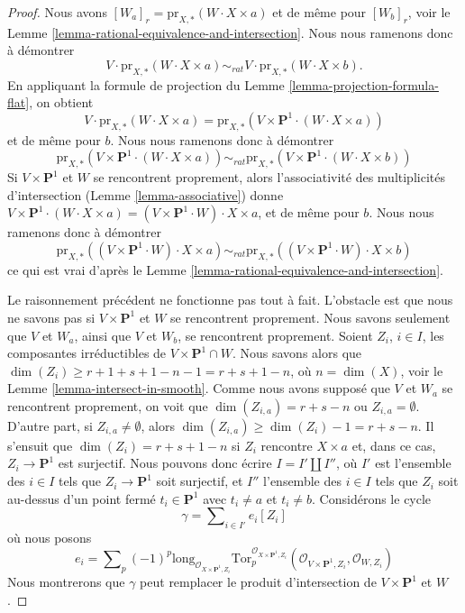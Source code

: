 \begin{proof}
Nous avons $[W_a]_r = \text{pr}_{X,*}(W \cdot X \times a)$ et de même pour
$[W_b]_r$, voir le Lemme \ref{lemma-rational-equivalence-and-intersection}.
Nous nous ramenons donc à démontrer
$$
V \cdot \text{pr}_{X,*}( W \cdot X \times a) \sim_{rat} V \cdot
\text{pr}_{X,*}( W \cdot X\times b).
$$
En appliquant la formule de projection du
Lemme \ref{lemma-projection-formula-flat}, on obtient
$$
V \cdot \text{pr}_{X,*}( W \cdot X\times a) =
\text{pr}_{X,*}(V \times \mathbf{P}^1 \cdot (W \cdot X\times a))
$$
et de même pour $b$. Nous nous ramenons donc à démontrer
$$
\text{pr}_{X,*}(V \times \mathbf{P}^1 \cdot (W \cdot X\times a))
\sim_{rat}
\text{pr}_{X,*}(V \times \mathbf{P}^1 \cdot (W \cdot X\times b))
$$
Si $V \times \mathbf{P}^1$ et $W$ se rencontrent proprement, alors
l'associativité des multiplicités d'intersection
(Lemme \ref{lemma-associative})
donne $V \times \mathbf{P}^1 \cdot (W \cdot X\times a) =
(V \times \mathbf{P}^1 \cdot W) \cdot X \times a$,
et de même pour $b$. Nous nous ramenons donc à démontrer
$$
\text{pr}_{X,*}((V \times \mathbf{P}^1 \cdot W) \cdot X\times a)
\sim_{rat}
\text{pr}_{X,*}((V \times \mathbf{P}^1 \cdot W) \cdot X\times b)
$$
ce qui est vrai d'après le Lemme \ref{lemma-rational-equivalence-and-intersection}.

\medskip\noindent
Le raisonnement précédent ne fonctionne pas tout à fait. L'obstacle est que
nous ne savons pas si $V \times \mathbf{P}^1$ et $W$ se rencontrent proprement.
Nous savons seulement que $V$ et $W_a$, ainsi que $V$ et $W_b$, se rencontrent proprement.
Soient $Z_i$, $i \in I$, les composantes irréductibles de
$V \times \mathbf{P}^1 \cap W$. Nous savons alors que
$\dim(Z_i) \geq r + 1 + s + 1 - n - 1 = r + s + 1 - n$, où $n = \dim(X)$, voir
le Lemme \ref{lemma-intersect-in-smooth}. Comme nous avons supposé
que $V$ et $W_a$ se rencontrent proprement, on voit que
$\dim(Z_{i, a}) = r + s - n$ ou $Z_{i, a} = \emptyset$.
D'autre part, si $Z_{i, a} \not = \emptyset$, alors
$\dim(Z_{i, a}) \geq \dim(Z_i) - 1 = r + s - n$.
Il s'ensuit que $\dim(Z_i) = r + s + 1 - n$ si $Z_i$ rencontre $X \times a$
et, dans ce cas, $Z_i \to \mathbf{P}^1$ est surjectif.
Nous pouvons donc écrire $I = I' \amalg I''$, où $I'$ est l'ensemble des $i \in I$
tels que $Z_i \to \mathbf{P}^1$ soit surjectif, et $I''$ l'ensemble des
$i \in I$ tels que $Z_i$ soit au-dessus d'un point fermé $t_i \in \mathbf{P}^1$
avec $t_i \not = a$ et $t_i \not = b$. Considérons le cycle
$$
\gamma = \sum\nolimits_{i \in I'} e_i [Z_i]
$$
où nous posons
$$
e_i = \sum\nolimits_p (-1)^p
\text{long}_{\mathcal{O}_{X \times \mathbf{P}^1, Z_i}}
\text{Tor}_p^{\mathcal{O}_{X \times \mathbf{P}^1, Z_i}}(
\mathcal{O}_{V \times \mathbf{P}^1, Z_i}, \mathcal{O}_{W, Z_i})
$$
Nous montrerons que $\gamma$ peut remplacer
le produit d'intersection de $V \times \mathbf{P}^1$ et $W$.


\end{proof}
